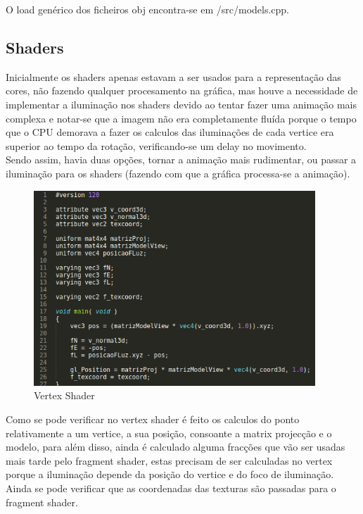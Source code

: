 \documentclass[11pt,a4paper]{report}
\begin{document}
O load genérico dos ficheiros obj encontra-se em /src/models.cpp.

\subsection{Shaders}

Inicialmente os shaders apenas estavam a ser usados para a representação das cores, não fazendo qualquer procesamento na gráfica, mas houve a necessidade de implementar a iluminação nos shaders devido ao tentar fazer uma animação mais complexa e notar-se que a imagem não era completamente fluída porque o tempo que o CPU demorava a fazer os calculos das iluminações de cada vertice era superior ao tempo da rotação, verificando-se um delay no movimento.\\

Sendo assim, havia duas opções, tornar a animação mais rudimentar, ou passar a iluminação para os shaders (fazendo com que a gráfica processa-se a animação).

\begin{figure}[H]
\centerline{\includegraphics[width=300pt]{images/vertexshader.png}}
\caption{Vertex Shader}
\label{img:complete}
\end{figure}

Como se pode verificar no vertex shader é feito os calculos do ponto relativamente a um vertice, a sua posição, consoante a matrix projecção e o modelo, para além disso, ainda é calculado alguma fracções que vão ser usadas mais tarde pelo fragment shader, estas precisam de ser calculadas no vertex porque a iluminação depende da posição do vertice e do foco de iluminação.\\

Ainda se pode verificar que as coordenadas das texturas são passadas para o fragment shader.
\end{document}
